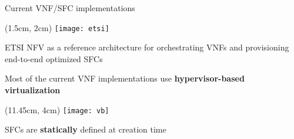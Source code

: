 \begin{frame}{Current VNF/SFC implementations}

  \vspace{1cm}

  \begin{textblock*}{1cm}(1.5cm, 2cm)
    \texttt{[image: etsi]}
  \end{textblock*}

  ETSI NFV as a reference architecture for orchestrating VNFs and provisioning
  end-to-end optimized SFCs

  \vfill{}

  Most of the current VNF implementations use \textbf{hypervisor-based
  virtualization}

  \begin{textblock*}{1cm}(11.45cm, 4cm)
    \texttt{[image: vb]}
  \end{textblock*}

  \vfill{}

  SFCs are \textbf{statically} defined at creation time

  \vfill{}

\end{frame}